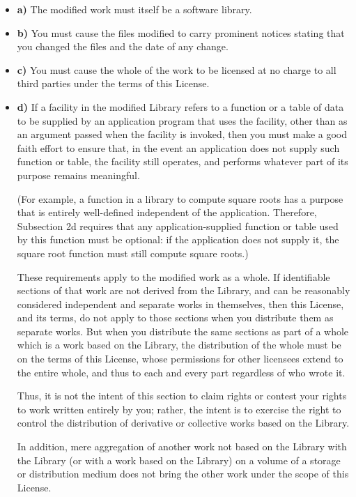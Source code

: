 \begin{itemize}
\item {\bf a)}  The modified work must itself be a software library.
\item {\bf b)}  You must cause the files modified to carry prominent notices
   stating that you changed the files and the date of any change.
\item {\bf c)}  You must cause the whole of the work to be licensed at no
   charge to all third parties under the terms of this License.
\item {\bf d)}  If a facility in the modified Library refers to a function or
   a  table of data to be supplied by an application program that uses  the
   facility, other than as an argument passed when the facility  is invoked, then
you must make a good faith effort to ensure that,  in the event an application
does not supply such function or  table, the facility still operates, and
performs whatever part of  its purpose remains meaningful.

(For example, a function in a library to compute square roots has  a purpose
that is entirely well-defined independent of the  application. Therefore,
Subsection 2d requires that any  application-supplied function or table used
by this function must  be optional: if the application does not supply it, the
square  root function must still compute square roots.)

These requirements apply to the modified work as a whole. If  identifiable
sections of that work are not derived from the Library,  and can be reasonably
considered independent and separate works in  themselves, then this License,
and its terms, do not apply to those  sections when you distribute them as
separate works. But when you  distribute the same sections as part of a whole
which is a work based  on the Library, the distribution of the whole must be
on the terms of  this License, whose permissions for other licensees extend to
the  entire whole, and thus to each and every part regardless of who wrote
it.

Thus, it is not the intent of this section to claim rights or contest  your
rights to work written entirely by you; rather, the intent is to  exercise the
right to control the distribution of derivative or  collective works based on
the Library.

In addition, mere aggregation of another work not based on the Library  with
the Library (or with a work based on the Library) on a volume of  a storage or
distribution medium does not bring the other work under  the scope of this
License.
\end{itemize}


